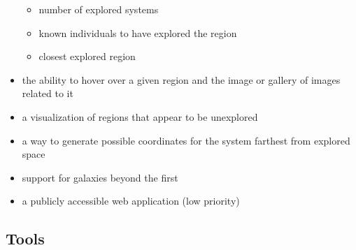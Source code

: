 \documentclass[
]{article}
\providecommand{\tightlist}{%
  \setlength{\itemsep}{0pt}\setlength{\parskip}{0pt}}
\begin{document}
\begin{itemize}
  \begin{itemize}
  \tightlist
  \item
    number of explored systems\\
  \item
    known individuals to have explored the region\\
  \item
    closest explored region\\
  \end{itemize}
\item
  the ability to hover over a given region and the image or gallery of
  images related to it\\
\item
  a visualization of regions that appear to be unexplored\\
\item
  a way to generate possible coordinates for the system farthest from
  explored space\\
\item
  support for galaxies beyond the first\\
\item
  a publicly accessible web application (low priority)
\end{itemize}

\hypertarget{tools}{%
\subsection{Tools}\label{tools}}
\end{document}
